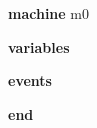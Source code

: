 \begin{block}
  \item   \textbf{machine} m0
  \item   \textbf{variables}
  \begin{block}
  \end{block}
  \item   \textbf{events}
  \begin{block}
  \end{block}
  \item   \textbf{end} \\
\end{block}
